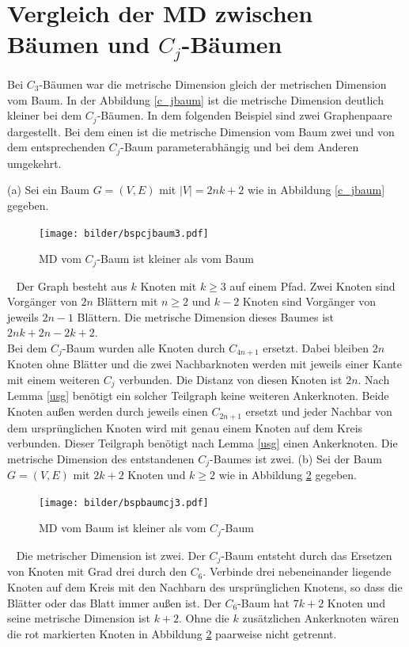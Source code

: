 \section{Vergleich der MD zwischen Bäumen und $C_j$-Bäumen}
Bei $C_3$-Bäumen war die metrische Dimension gleich der metrischen Dimension vom Baum. In der Abbildung \ref{c_jbaum} ist die metrische Dimension deutlich kleiner bei dem $C_j$-Bäumen. In dem folgenden Beispiel sind zwei Graphenpaare dargestellt. Bei dem einen ist die metrische Dimension vom Baum zwei und von dem entsprechenden $C_j$-Baum parameterabhängig und bei dem Anderen umgekehrt.\\
\begin{bsp} (a) Sei ein Baum $G=(V,E)$ mit $|V|=2nk+2$ wie in Abbildung \ref{c_jbaum} gegeben.

\begin{figure}[ht]
\centering
\texttt{[image: bilder/bspcjbaum3.pdf]}
\caption{MD vom $C_j$-Baum ist kleiner als vom Baum}
\label{cjbaum}
\end{figure}
\vspace{-5mm}
~\linebreak
Der Graph besteht aus $k$ Knoten mit $k\geq 3$ auf einem Pfad. Zwei Knoten sind Vorgänger von $2n$ Blättern mit $n\geq 2$ und $k-2$ Knoten sind Vorgänger von jeweils $2n-1$ Blättern. Die metrische Dimension dieses Baumes ist $2nk+2n-2k+2$.\\
Bei dem $C_j$-Baum wurden alle Knoten durch $C_{4n+1}$ ersetzt. Dabei bleiben $2n$ Knoten ohne Blätter und die zwei Nachbarknoten werden mit jeweils einer Kante mit einem weiteren $C_j$ verbunden. Die Distanz von diesen Knoten ist $2n$. Nach Lemma \ref{usg} benötigt ein solcher Teilgraph keine weiteren Ankerknoten. Beide Knoten außen werden durch jeweils einen $C_{2n+1}$ ersetzt und jeder Nachbar von dem ursprünglichen Knoten wird mit genau einem Knoten auf dem Kreis verbunden. Dieser Teilgraph benötigt nach Lemma \ref{usg} einen Ankerknoten. Die metrische Dimension des entstandenen $C_j$-Baumes ist zwei.\newline\newline
(b) Sei der Baum $G=(V,E)$ mit $2k+2$ Knoten und $k\geq 2$ wie in Abbildung \ref{baumcj} gegeben.
\begin{figure}[ht]
\centering
\texttt{[image: bilder/bspbaumcj3.pdf]}
\caption{MD vom Baum ist kleiner als vom $C_j$-Baum}
\label{baumcj}
\end{figure}
\vspace{-3mm}
~\linebreak
Die metrischer Dimension ist zwei. Der $C_j$-Baum entsteht durch das Ersetzen von Knoten mit Grad drei durch den $C_6$. Verbinde drei nebeneinander liegende Knoten auf dem Kreis mit den Nachbarn des ursprünglichen Knotens, so dass die Blätter oder das Blatt immer außen ist. Der $C_6$-Baum hat $7k+2$ Knoten und seine metrische Dimension ist $k+2$. Ohne die $k$ zusätzlichen Ankerknoten wären die rot markierten Knoten in Abbildung \ref{baumcj} paarweise nicht getrennt.
\end{bsp}
